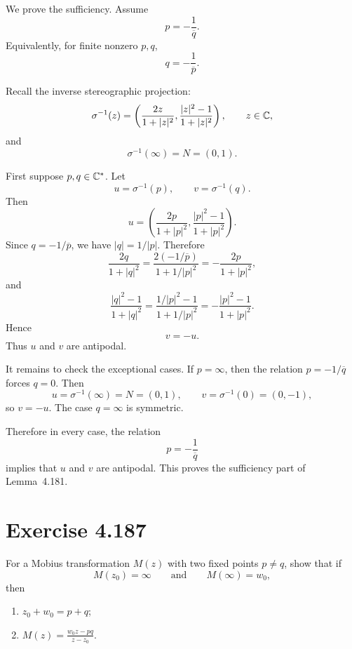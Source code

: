 \documentclass{article}
\begin{document}
\begin{solution}
  We prove the sufficiency. Assume
  \[
    p=-\frac1{\overline q}.
  \]
  Equivalently, for finite nonzero $p,q$,
  \[
    q=-\frac1{\overline p}.
  \]

  Recall the inverse stereographic projection:
  \[
    \sigma^{-1}(z)
    =
    \left(
      \frac{2z}{1+|z|^2},
      \frac{|z|^2-1}{1+|z|^2}
    \right),
    \qquad z\in\mathbb{C},
  \]
  and
  \[
    \sigma^{-1}(\infty)=N=(0,1).
  \]

  First suppose $p,q\in\mathbb{C}^\ast$. Let
  \[
    u=\sigma^{-1}(p),
    \qquad
    v=\sigma^{-1}(q).
  \]
  Then
  \[
    u=
    \left(
      \frac{2p}{1+|p|^2},
      \frac{|p|^2-1}{1+|p|^2}
    \right).
  \]
  Since $q=-1/\overline p$, we have $|q|=1/|p|$. Therefore
  \[
    \frac{2q}{1+|q|^2}
    =
    \frac{2(-1/\overline p)}{1+1/|p|^2}
    =
    -\frac{2p}{1+|p|^2},
  \]
  and
  \[
    \frac{|q|^2-1}{1+|q|^2}
    =
    \frac{1/|p|^2-1}{1+1/|p|^2}
    =
    -\frac{|p|^2-1}{1+|p|^2}.
  \]
  Hence
  \[
    v=-u.
  \]
  Thus $u$ and $v$ are antipodal.

  It remains to check the exceptional cases. If $p=\infty$, then the relation
  $p=-1/\overline q$ forces $q=0$. Then
  \[
    u=\sigma^{-1}(\infty)=N=(0,1),
    \qquad
    v=\sigma^{-1}(0)=(0,-1),
  \]
  so $v=-u$. The case $q=\infty$ is symmetric.

  Therefore in every case, the relation
  \[
    p=-\frac1{\overline q}
  \]
  implies that $u$ and $v$ are antipodal. This proves the sufficiency part of
  Lemma~4.181.
\end{solution}

\section{Exercise 4.187}

For a Mobius transformation $M(z)$ with two fixed points $p\ne q$, show that
if
\[
  M(z_0)=\infty
  \qquad\text{and}\qquad
  M(\infty)=w_0,
\]
then

\begin{enumerate}
  \item[(a)] $z_0+w_0=p+q$;
  \item[(b)] $\displaystyle M(z)=\frac{w_0z-pq}{z-z_0}$.
\end{enumerate}
\end{document}
